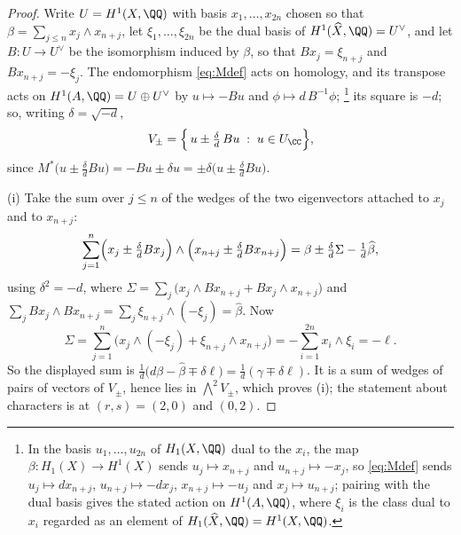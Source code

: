 \begin{proof}
Write $U=H^{1}(X,\QQ)$ with basis $x_{1},\dots,x_{2n}$ chosen so that
$\beta=\sum_{j\le n}x_{j}\wedge x_{n+j}$, let $\xi_{1},\dots,\xi_{2n}$ be the
dual basis of $H^{1}(\widehat{X},\QQ)=U^{\vee}$, and let $B\colon U\to U^{\vee}$
be the isomorphism induced by $\beta$, so that $Bx_{j}=\xi_{n+j}$ and
$Bx_{n+j}=-\xi_{j}$. The endomorphism \eqref{eq:Mdef} acts on homology, and
its transpose acts on $H^{1}(A,\QQ)=U\oplus U^{\vee}$ by $u\mapsto -Bu$ and
$\phi\mapsto d\,B^{-1}\phi$;%
\footnote{In the basis $u_{1},\dots,u_{2n}$ of $H_{1}(X,\QQ)$ dual to the
$x_{i}$, the map $\beta\colon H_{1}(X)\to H^{1}(X)$ sends $u_{j}\mapsto
x_{n+j}$ and $u_{n+j}\mapsto-x_{j}$, so \eqref{eq:Mdef} sends
$u_{j}\mapsto dx_{n+j}$, $u_{n+j}\mapsto-dx_{j}$, $x_{n+j}\mapsto-u_{j}$ and
$x_{j}\mapsto u_{n+j}$; pairing with the dual basis gives the stated action
on $H^{1}(A,\QQ)$, where $\xi_{i}$ is the class dual to $x_{i}$ regarded as an
element of $H_{1}(\widehat X,\QQ)=H^{1}(X,\QQ)$.} its
square is $-d$; so, writing $\delta=\sqrt{-d}$,
\begin{equation}\label{eq:splitVpm}
  V_{\pm}=\Bigl\{\,u\pm\tfrac{\delta}{d}\,Bu\;:\;u\in U_{\CC}\Bigr\},
\end{equation}
since $M^{*}\bigl(u\pm\tfrac{\delta}{d}Bu\bigr)
=-Bu\pm\delta u=\pm\delta\bigl(u\pm\tfrac{\delta}{d}Bu\bigr)$.

(i) Take the sum over $j\le n$ of the wedges of the two eigenvectors attached
to $x_{j}$ and to $x_{n+j}$:
\[
  \sum_{j=1}^{n}
  \Bigl(x_{j}\pm\tfrac{\delta}{d}Bx_{j}\Bigr)\wedge
  \Bigl(x_{n+j}\pm\tfrac{\delta}{d}Bx_{n+j}\Bigr)
  =\beta\pm\tfrac{\delta}{d}\Sigma-\tfrac{1}{d}\widehat{\beta},
\]
using $\delta^{2}=-d$, where
$\Sigma=\sum_{j}\bigl(x_{j}\wedge Bx_{n+j}+Bx_{j}\wedge x_{n+j}\bigr)$ and
$\sum_{j}Bx_{j}\wedge Bx_{n+j}=\sum_{j}\xi_{n+j}\wedge(-\xi_{j})
=\widehat{\beta}$. Now
\[
  \Sigma=\sum_{j=1}^{n}\bigl(x_{j}\wedge(-\xi_{j})
        +\xi_{n+j}\wedge x_{n+j}\bigr)
   =-\sum_{i=1}^{2n}x_{i}\wedge\xi_{i}=-\ell .
\]
So the displayed sum is $\tfrac1d\bigl(d\beta-\widehat{\beta}\mp\delta\ell\bigr)
=\tfrac1d(\gamma\mp\delta\ell)$. It is a sum of wedges of pairs of vectors of
$V_{\pm}$, hence lies in $\bigwedge^{2}V_{\pm}$, which proves (i); the
statement about characters is  at $(r,s)=(2,0)$ and
$(0,2)$.


\end{proof}
